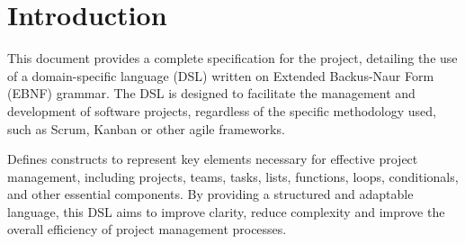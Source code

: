 \section{Introduction}
\label{sec:introduction}
This document provides a complete specification for the project, detailing the use of a domain-specific language (DSL) written on Extended Backus-Naur Form (EBNF) grammar. The DSL is designed to facilitate the management and development of software projects, regardless of the specific methodology used, such as Scrum, Kanban or other agile frameworks.

Defines constructs to represent key elements necessary for effective project management, including projects, teams, tasks, lists, functions, loops, conditionals, and other essential components. By providing a structured and adaptable language, this DSL aims to improve clarity, reduce complexity and improve the overall efficiency of project management processes.


